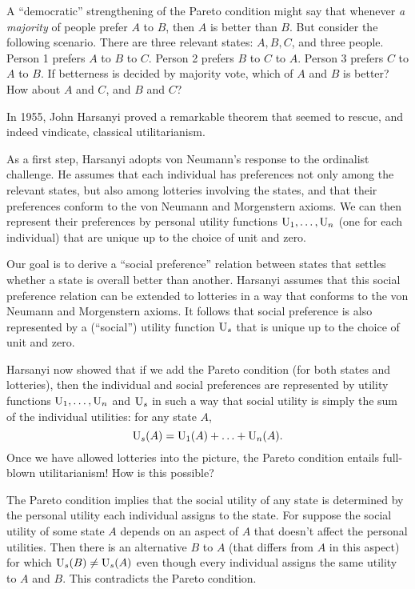 \begin{exercise}{1}
  A ``democratic'' strengthening of the Pareto condition might say that whenever
  \emph{a majority} of people prefer $A$ to $B$, then $A$ is better than $B$.
  But consider the following scenario. There are three relevant states: $A,B,C$,
  and three people. Person 1 prefers $A$ to $B$ to $C$. Person 2 prefers $B$ to
  $C$ to $A$. Person 3 prefers $C$ to $A$ to $B$. If betterness is decided by
  majority vote, which of $A$ and $B$ is better? How about $A$ and $C$, and $B$
  and $C$?
\end{exercise}

In 1955, John Harsanyi proved a remarkable theorem that seemed to rescue, and
indeed vindicate, classical utilitarianism.

As a first step, Harsanyi adopts von Neumann's response to the ordinalist
challenge. He assumes that each individual has preferences not only among the
relevant states, but also among lotteries involving the states, and that their
preferences conform to the von Neumann and Morgenstern axioms. We can then
represent their preferences by personal utility functions $\text{U}_{1},\ldots,\text{U}_{n}$
(one for each individual) that are unique up to the choice of unit and zero.

Our goal is to derive a ``social preference'' relation between states that
settles whether a state is overall better than another. Harsanyi assumes that
this social preference relation can be extended to lotteries in a way that
conforms to the von Neumann and Morgenstern axioms. It follows that social
preference is also represented by a (``social'') utility function $\text{U}_{s}$
that is unique up to the choice of unit and zero.

Harsanyi now showed that if we add the Pareto condition (for both states and
lotteries), then the individual and social preferences are represented by
utility functions $\text{U}_1,\ldots,\text{U}_n$ and $\text{U}_s$ in such a way that social
utility is simply the sum of the individual utilities: for any state $A$,
\[
  \text{U}_s(A) = \text{U}_1(A) + \ldots + \text{U}_n(A).
\]
Once we have allowed lotteries into the picture, the Pareto condition entails
full-blown utilitarianism! How is this possible?

The Pareto condition implies that the social utility of any state is determined
by the personal utility each individual assigns to the state. For suppose the
social utility of some state $A$ depends on an aspect of $A$ that doesn't affect
the personal utilities. Then there is an alternative $B$ to $A$ (that differs
from $A$ in this aspect) for which $\text{U}_{s}(B) \not= \text{U}_{s}(A)$ even though every
individual assigns the same utility to $A$ and $B$. This contradicts the Pareto
condition.

